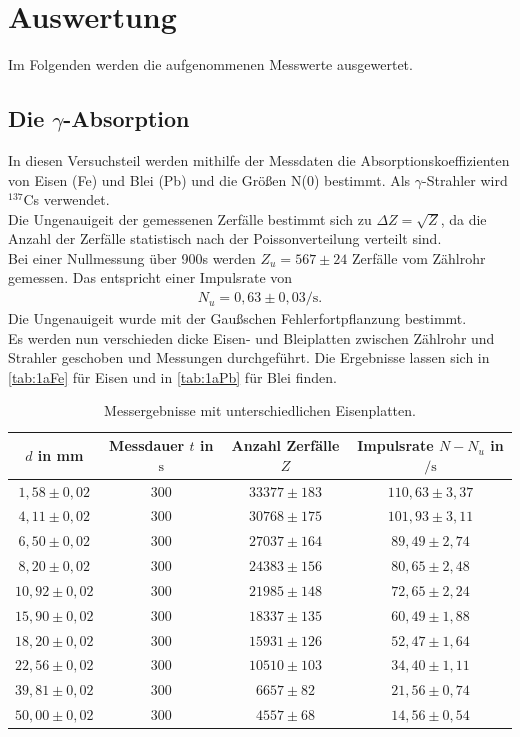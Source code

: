 \section{Auswertung}
\label{sec:Auswertung}

Im Folgenden werden die aufgenommenen Messwerte ausgewertet.

\subsection{Die $γ$-Absorption}

In diesen Versuchsteil werden mithilfe der Messdaten die Absorptionskoeffizienten von Eisen (Fe) und Blei (Pb)
und die Größen N(0) bestimmt. Als $\gamma$-Strahler wird $^{137}$Cs verwendet.\\
Die Ungenauigeit der gemessenen Zerfälle bestimmt sich zu $\Delta Z = \sqrt{Z}$, da die Anzahl der Zerfälle
statistisch nach der Poissonverteilung verteilt sind.\\
Bei einer Nullmessung über 900s werden $Z_u = 567 \pm 24$ Zerfälle vom Zählrohr gemessen. Das entspricht einer
Impulsrate von 
\begin{align*}
  N_u = 0,63 \pm 0,03 \si{\per\second}.
\end{align*}
Die Ungenauigeit wurde mit der Gaußschen Fehlerfortpflanzung bestimmt.\\
Es werden nun verschieden dicke Eisen- und Bleiplatten zwischen Zählrohr und Strahler geschoben und Messungen 
durchgeführt. Die Ergebnisse lassen sich in \autoref{tab:1aFe} für Eisen und in \autoref{tab:1aPb} für Blei finden.\\
\begin{table}
  \centering
  \caption{Messergebnisse mit unterschiedlichen Eisenplatten.}
  \label{tab:1aFe}
  \begin{tabular}{c c c c}
    $d$ in \si{\milli\meter} & Messdauer $t$ in $\si{\second}$ & Anzahl Zerfälle $Z$  &  Impulsrate $N-N_u$ in $\si{\per\second}$\\
       \midrule
        $1,58 \pm 0,02$   &  300   &  $33377 \pm 183$ & $110,63 \pm 3,37$ \\
        $4,11 \pm 0,02$   &  300   &  $30768 \pm 175$ & $101,93 \pm 3,11$\\
        $6,50 \pm 0,02$   &  300   &  $27037 \pm 164$ & $89,49 \pm 2,74$\\
        $8,20 \pm 0,02$   &  300   &  $24383 \pm 156$ & $80,65 \pm 2,48$\\
        $10,92 \pm 0,02$  &  300   &  $21985 \pm 148$ & $72,65 \pm 2,24$\\
        $15,90 \pm 0,02$  &  300   &  $18337 \pm 135$ & $60,49 \pm 1,88$\\
        $18,20 \pm 0,02$  &  300   &  $15931 \pm 126$ & $52,47 \pm 1,64$\\
        $22,56 \pm 0,02$  &  300   &  $10510 \pm 103$ & $34,40 \pm 1,11$\\
        $39,81 \pm 0,02$  &  300   &  $ 6657 \pm 82$ & $21,56 \pm 0,74$\\
        $50,00 \pm 0,02$  &  300   &  $ 4557 \pm 68$ & $14,56 \pm 0,54$\\
      \bottomrule
    \end{tabular}
\end{table}

